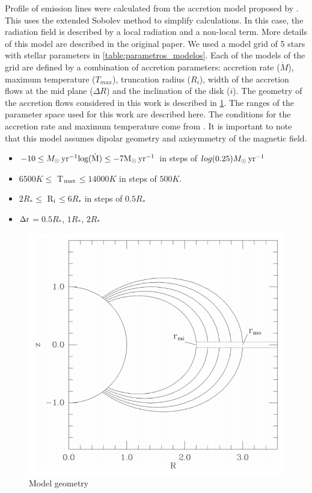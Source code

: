 \documentclass[twocolumn,linenumbers]{aastex631}
\newcommand{\Mdot}{{\dot{{M}}}}
\newcommand{\msunyr}{M_{\sun} \, \rm{ yr^{-1}}}
\newcommand{\ri}{R$_{\rm i}$}
\newcommand{\Dr}{$\Delta \rm r$}
\newcommand{\tmax}{T$_{\rm max}$}
\begin{document}
Profile of emission lines were calculated from the accretion model proposed by \citet{muzerolle2001}. This uses the extended Sobolev method to simplify calculations. In this case, the radiation field is described by a local radiation and a non-local term. More details of this model are described in the original paper. We used a model grid of 5 stars with stellar parameters in \ref{table:parametros_modelos}. Each of the models of the grid are defined by a combination of accretion parameters: accretion rate ($\dot{M}$), maximum temperature ($T_{max}$), truncation radius ($R_i$), width of the accretion flows at the mid plane ($\Delta R$) and the inclination of the disk ($i$). The geometry of the accretion flows considered in this work is described in \ref{fig:model_geometry}.  The ranges of the parameter space used for this work are described here. The conditions for the accretion rate and maximum temperature come from \citet{muzerolle2001}.  It is important to note that this model assumes dipolar geometry and axisymmetry of the magnetic field. 

\begin{itemize}
    \item $-10 \leq \msunyr log(\Mdot) \leq -7\msunyr$ in steps of $log(0.25) \msunyr$
    \item $6500 K \leq$ \tmax $\leq 14000 K$ in steps of $500 K$.
    \item $2 R_* \leq$ \ri $\leq 6 R_*$ in steps of $0.5 R_*$
    \item \Dr $= 0.5 R_*$, $1 R_*$, $2 R_*$
\end{itemize}

\begin{figure}
    \centering
    \includegraphics[width=0.75\linewidth]{figures/geometry.png}
    \caption{Model geometry}
    \label{fig:model_geometry}
\end{figure}
\end{document}

